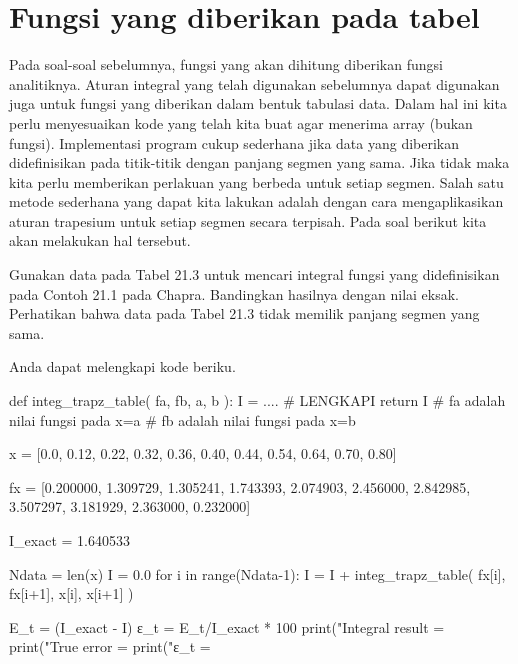 \section{Fungsi yang diberikan pada tabel}

Pada soal-soal sebelumnya, fungsi yang akan dihitung diberikan fungsi analitiknya.
Aturan integral yang telah digunakan sebelumnya dapat digunakan juga untuk
fungsi yang diberikan dalam bentuk tabulasi data. Dalam hal ini kita perlu
menyesuaikan kode yang telah kita buat agar menerima array (bukan fungsi).
Implementasi program cukup sederhana jika data yang diberikan didefinisikan
pada titik-titik dengan panjang segmen yang sama. Jika tidak maka kita perlu
memberikan perlakuan yang berbeda untuk setiap segmen.
Salah satu metode sederhana yang dapat kita lakukan adalah dengan cara mengaplikasikan
aturan trapesium untuk setiap segmen secara terpisah. Pada soal berikut kita akan
melakukan hal tersebut.

\begin{soal}
Gunakan data pada Tabel 21.3 untuk mencari integral fungsi yang didefinisikan pada
Contoh 21.1 pada Chapra. Bandingkan hasilnya dengan nilai eksak. Perhatikan
bahwa data pada Tabel 21.3 tidak memilik panjang segmen yang sama.
\end{soal}

Anda dapat melengkapi kode beriku.
\begin{pythoncode}
def integ_trapz_table( fa, fb, a, b ):
    I = .... # LENGKAPI
    return I
# fa adalah nilai fungsi pada x=a
# fb adalah nilai fungsi pada x=b

x = [0.0, 0.12, 0.22, 0.32, 0.36, 0.40,
     0.44, 0.54, 0.64, 0.70, 0.80]

fx = [0.200000, 1.309729, 1.305241, 1.743393, 2.074903, 2.456000, 
      2.842985, 3.507297, 3.181929, 2.363000, 0.232000]

I_exact = 1.640533

Ndata = len(x)
I = 0.0
for i in range(Ndata-1):
    I = I + integ_trapz_table( fx[i], fx[i+1], x[i], x[i+1] )

E_t = (I_exact - I)
ε_t = E_t/I_exact * 100
print("Integral result = %
print("True error      = %
print("ε_t             = %
\end{pythoncode}